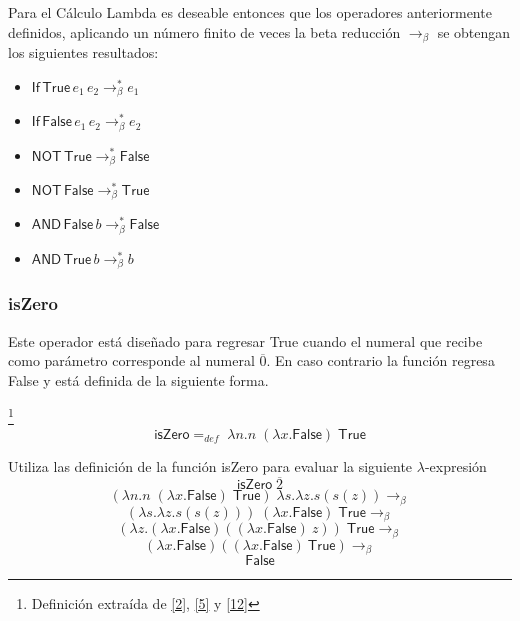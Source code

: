 Para el Cálculo Lambda es deseable entonces que los operadores anteriormente definidos, aplicando un número finito de veces la beta reducción $\to_\beta$ se obtengan los siguientes resultados:
   \begin{center}

        \begin{itemize} \centering
            \item $\mathsf{If}\,\textsf{True}\,e_1\,e_2 \to_\beta^* e_1$ 
            \item $\mathsf{If}\,\textsf{False}\,e_1\,e_2 \to_\beta^* e_2$ 
            \item $\mathsf{NOT}\,\textsf{True}\to_\beta^* \textsf{False}$
            \item $\mathsf{NOT}\,\textsf{False}\to_\beta^* \textsf{True}$
            \item $\mathsf{AND}\,\textsf{False}\,b\to_\beta^* \textsf{False}$
            \item $\mathsf{AND}\,\textsf{True}\,b\to_\beta^* b$
        \end{itemize}
   \end{center} 

        \subsubsection{isZero}
        	Este operador está diseñado para regresar \textsf{True} cuando el numeral que recibe como parámetro corresponde al numeral $\overline{0}$. En caso contrario la función regresa \textsf{False} y está definida de la siguiente forma.
        
	\begin{definition}\footnote{Definición extraída de \hyperlink{2}{[2]},  \hyperlink{5}{[5]} y \hyperlink{12}{[12]}}
            $$\textsf{isZero} =_{def}  \; \lambda n. n\;(\lambda x.\textsf{False}) \;\textsf{True}$$
        \end{definition}
        \begin{exercise}
            Utiliza las definición de la función \textsf{isZero} para evaluar la siguiente $\lambda$-expresión
            \[
                \textsf{isZero}  \; \overline{2}
            \]
            \[
                (\lambda n. n\;(\lambda x.\textsf{False})\;\textsf{True}) \; \lambda s.\lambda z.s(s(z)) \rightarrow_\beta 
            \]
		\[
			(\lambda s.\lambda z.s(s(z))) \; (\lambda x.\textsf{False}) \; \textsf{True}  \rightarrow_\beta 
		\]
		\[
			(\lambda z.(\lambda x.\textsf{False})((\lambda x.\textsf{False})\:z))\; \textsf{True}  \rightarrow_\beta 
		\]
		\[
			(\lambda x.\textsf{False}) ((\lambda x.\textsf{False})\:\textsf{True})  \rightarrow_\beta 
		\]
		\[
			 \textsf{False}
		\]
            

        \end{exercise}

